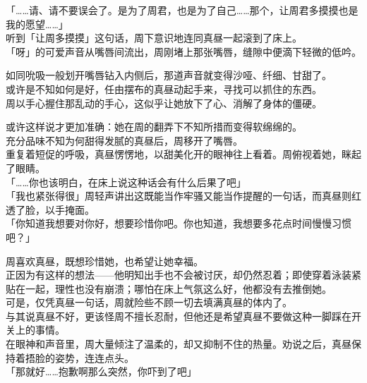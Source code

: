 「……请、请不要误会了。是为了周君，也是为了自己……那个，让周君多摸摸也是我的愿望……」\\

听到「让周多摸摸」这句话，周下意识地连同真昼一起滚到了床上。\\

「呀」的可爱声音从嘴唇间流出，周刚堵上那张嘴唇，缝隙中便滴下轻微的低吟。

如同吮吸一般划开嘴唇钻入内侧后，那道声音就变得沙哑、纤细、甘甜了。\\

或许是不知如何是好，任由摆布的真昼动起手来，寻找可以抓住的东西。\\

周以手心握住那乱动的手心，这似乎让她放下了心、消解了身体的僵硬。

或许这样说才更加准确：她在周的翻弄下不知所措而变得软绵绵的。\\

充分品味不知为何甜得发腻的真昼后，周移开了嘴唇。\\

重复着短促的呼吸，真昼愣愣地，以甜美化开的眼神往上看着。周俯视着她，眯起了眼睛。\\

「……你也该明白，在床上说这种话会有什么后果了吧」\\

「我也紧张得很」周轻声讲出这既能当作牢骚又能当作提醒的一句话，而真昼则红透了脸，以手掩面。\\

「你知道我想要对你好，想要珍惜你吧。你也知道，我想要多花点时间慢慢习惯吧？」

周喜欢真昼，既想珍惜她，也希望让她幸福。\\

正因为有这样的想法——他明知出手也不会被讨厌，却仍然忍着；即使穿着泳装紧贴在一起，理性也没有崩溃；哪怕在床上气氛这么好，他都没有去推倒她。\\

可是，仅凭真昼一句话，周就险些不顾一切去填满真昼的体内了。\\

与其说真昼不好，更该怪周不擅长忍耐，但他还是希望真昼不要做这种一脚踩在开关上的事情。\\

在眼神和声音里，周大量倾注了温柔的，却又抑制不住的热量。劝说之后，真昼保持着捂脸的姿势，连连点头。\\

「那就好……抱歉啊那么突然，你吓到了吧」


